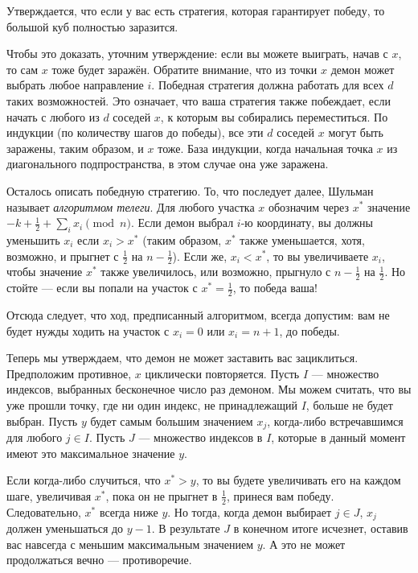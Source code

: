 Утверждается, что если у вас есть стратегия, которая гарантирует победу, то большой куб полностью заразится.

Чтобы это доказать, уточним утверждение: если вы можете выиграть, начав с $x$, то сам $x$ тоже будет заражён.
Обратите внимание, что из точки $x$ демон может выбрать любое направление $i$.
Победная стратегия должна работать для всех $d$ таких возможностей.
Это означает, что ваша стратегия также побеждает, если начать с любого из $d$ соседей $x$, к которым вы собирались переместиться.
По индукции (по количеству шагов до победы), все эти $d$ соседей $x$ могут быть заражены, таким образом, и $x$ тоже.
База индукции, когда начальная точка $x$ из диагонального подпространства, в этом случае она уже заражена.

Осталось описать победную стратегию.
То, что последует далее, Шульман называет \emph{алгоритмом телеги}.
Для любого участка $x$ обозначим через $x^*$ значение $-k + \tfrac12 + \sum_i x_i \pmod n$.
Если демон выбрал $i$-ю координату, вы должны уменьшить $x_i$ если $x_i > x^*$ (таким образом, $x^*$ также уменьшается, хотя, возможно, и прыгнет с $\tfrac12$ на $n - \tfrac12$).
Если же, $x_i < x^*$, то вы увеличиваете $x_i$, чтобы значение $x^*$ также увеличилось, или возможно, прыгнуло с $n - \tfrac12$ на $\tfrac12$.
Но стойте --- если вы попали на участок с $x^* = \tfrac12$, то победа ваша!

Отсюда следует, что ход, предписанный алгоритмом, всегда допустим:
вам не будет нужды ходить на участок с $x_i = 0$ или $x_i = n + 1$, до победы.

Теперь мы утверждаем, что демон не может заставить вас зациклиться.
Предположим противное, $x$ циклически повторяется.
Пусть $I$ --- множество индексов, выбранных бесконечное число раз демоном.
Мы можем считать, что вы уже прошли точку, где ни один индекс, не принадлежащий $I$, больше не будет выбран.
Пусть $y$ будет самым большим значением $x_j$, когда-либо встречавшимся для любого $j \in I$.
Пусть $J$ --- множество индексов в $I$, которые в данный момент имеют это максимальное значение $y$.

Если когда-либо случиться, что $x^* > y$, то вы будете увеличивать его на каждом шаге, увеличивая $x^*$, пока он не прыгнет в $\tfrac12$, принеся вам победу.
Следовательно, $x^*$ всегда ниже $y$.
Но тогда, когда демон выбирает $j \in J$, $x_j$ должен уменьшаться до $y - 1$.
В результате $J$ в конечном итоге исчезнет, оставив вас навсегда с меньшим максимальным значением $y$.
А это не может продолжаться вечно --- противоречие.

